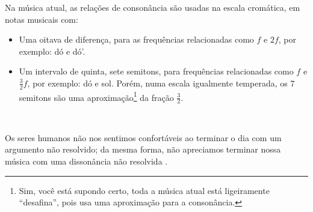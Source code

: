 Na música atual, as relações de consonância são usadas na escala cromática, 
em notas musicais com:
\begin{itemize} 
\item Uma oitava de diferença, para as frequências relacionadas como $f$ e $2f$, 
por exemplo: dó e dó'.
\item Um intervalo de quinta, sete semitons, para frequências relacionadas como  $f$ e $\frac{3}{2}f$, 
por exemplo: dó e sol. Porém, numa escala igualmente temperada, 
os 7 semitons são uma aproximação\footnote{Sim, você está supondo certo,
toda a música atual está ligeiramente ``desafina'', pois usa uma aproximação para a consonância.}
 da fração $\frac{3}{2}$.
\end{itemize}~


Os seres humanos não nos sentimos confortáveis ao terminar o dia com um argumento não resolvido; 
da mesma forma, não apreciamos terminar nossa música com uma dissonância não resolvida \cite[pp. 26]{wright2012essential}.

